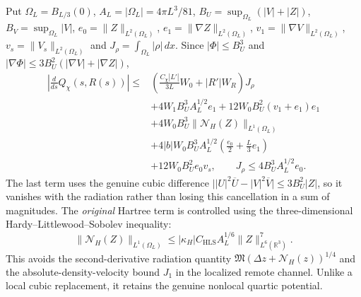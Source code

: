 Put $\Omega_L=B_{L/3}(0)$, $A_L=|\Omega_L|=4\pi L^3/81$,
$B_U=\sup_{\Omega_L}(|V|+|Z|)$,
$B_V=\sup_{\Omega_L}|V|$,
$e_0=\|Z\|_{L^2(\Omega_L)}$,
$e_1=\|\nabla Z\|_{L^2(\Omega_L)}$,
$v_1=\|\nabla V\|_{L^2(\Omega_L)}$,
$v_s=\|V_s\|_{L^2(\Omega_L)}$ and
$J_\rho=\int_{\Omega_L}|\rho|\,dx$.
Since $|\Phi|\le B_U^3$ and
$|\nabla\Phi|\le3B_U^2(|\nabla V|+|\nabla Z|)$,
\begin{align*}
 \left|\frac d{ds}Q_\chi(s,R(s))\right|
 \le{}&
 \left(\frac{C_\chi|L'|}{3L}W_0+
          |R'|W_R\right)J_\rho\\
 &+4W_1B_U^3A_L^{1/2}e_1
  +12W_0B_U^2(v_1+e_1)e_1\\
 &+4W_0B_U^3\|\mathcal N_H(Z)\|_{L^1(\Omega_L)}\\
 &+4|b|W_0B_U^3A_L^{1/2}
       \left(\frac{e_0}{2}+\frac L3e_1\right)\\
 &+12W_0B_U^2e_0v_s,
 \qquad
 J_\rho\le4B_U^3A_L^{1/2}e_0 .
\end{align*}
The last term uses the genuine cubic difference
$\big||U|^2\overline U-|V|^2\overline V\big|
 \le3B_U^2|Z|$, so it vanishes with the radiation rather
than losing this cancellation in a sum of magnitudes.
The \emph{original} Hartree term is controlled using the
three-dimensional Hardy--Littlewood--Sobolev inequality:
\[
 \|\mathcal N_H(Z)\|_{L^1(\Omega_L)}
 \le |\kappa_H|C_{\mathrm{HLS}}
          A_L^{1/6}\|Z\|_{L^6(\mathbb R^3)}^7.
\]
This avoids the second-derivative radiation quantity
$\mathfrak M(\Delta z+\mathcal N_H(z))^{1/4}$ and the
absolute-density-velocity bound $J_1$ in the localized
remote channel. Unlike a local cubic replacement, it retains
the genuine nonlocal quartic potential.


